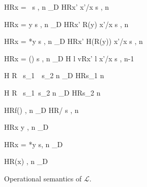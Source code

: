 \begin{figure}[p]
\begin{minipage}{\textwidth}
{\langle H\coma R\coma  \LET x = \NULL \ \IN s , n \rangle
  \longrightarrow_{D}
  \langle H\coma R\Lfc x' \mapsto \NULL \Rfc \coma   \Lb x'/x \Rb s , n  \rangle }

{\langle H\coma R\coma \LET x = y \; \IN s , n \rangle
  \longrightarrow_{D}
  \langle H\coma R\Lfc x' \mapsto R(y) \Rfc \coma   \Lb x'/x \Rb s , n  \rangle }

{\langle H\coma R\coma  \LET x = *y \; \IN s , n \rangle
  \longrightarrow_{D}
  \langle H\coma R\Lfc x' \mapsto H(R(y)) \Rfc \coma   \Lb x'/x \Rb s , n  \rangle }

{\langle H\coma R\coma  \LET x = \Malloc() \; \IN s , n \rangle
  \xlongrightarrow{\Malloc}_{D}
  \langle H \Lfc l \rightarrow v\Rfc \coma R\Lfc x' \rightarrow l \Rfc \coma   \Lb x'/x \Rb s , n-1  \rangle }

{\langle H \coma R \coma \IFNULL\Cirx\ \THEN   s_{1}\ \ELSE\  s_{2} \coma  n \rangle
  \longrightarrow_{D}
  \langle H\coma R\coma s_{1} \coma n \rangle}

{\langle H \coma R \coma \IFNULL\Cirx\ \THEN  s_{1}\ \ELSE  s_{2} \coma  n \rangle
  \longrightarrow_{D}
  \langle H\coma R\coma s_{2} \coma  n \rangle}

{ \langle H\coma R\coma  f() , n \rangle
  \longrightarrow_{D}
  \langle H\coma R\coma  \Lb {}/ \Rb s , n \rangle}

\begin{minipage}{0.5\textwidth}
{\langle H\coma R\coma  *x \leftarrow y , n \rangle
  \longrightarrow_{D} \MEMEX }
\end{minipage}
\begin{minipage}{0.5\textwidth}
{\langle H\coma R\coma  \LET x = *y \; \IN s, n \rangle
    \longrightarrow_{D} \MEMEX}
\end{minipage}

{\langle H\coma R\coma \Free(x) , n \rangle \xlongrightarrow{\Free}_{D} \MEMEX}


\end{minipage}

\caption{Operational semantics of \(\mathcal{L}\).}
\label{fig:transitionRules}
\end{figure}

